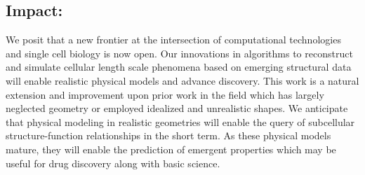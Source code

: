 \documentclass[12pt]{article}
\begin{document}
\subsection{Impact:}
We posit that a new frontier at the intersection of computational technologies and single cell biology is now open.
Our innovations in algorithms to reconstruct and simulate cellular length scale phenomena based on emerging structural data will enable realistic physical models and advance discovery.
This work is a natural extension and improvement upon prior work in the field which has largely neglected geometry or employed idealized and unrealistic shapes.
We anticipate that physical modeling in realistic geometries will enable the query of subcellular structure-function relationships in the short term.
As these physical models mature, they will enable the prediction of emergent properties which may be useful for drug discovery along with basic science.
\end{document}
